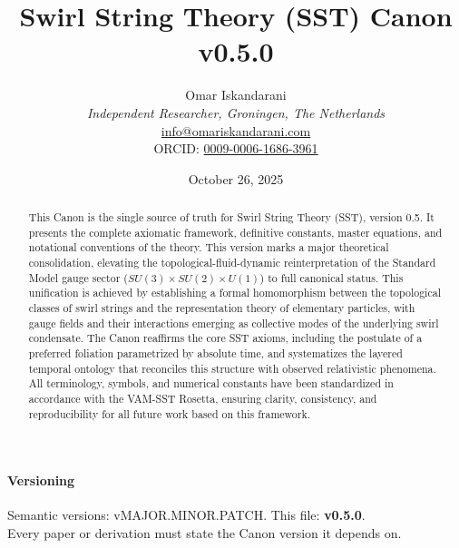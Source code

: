 \documentclass[11pt]{article}
\newcommand{\canonversion}{\textbf{v0.5.0}}
\newcommand{\papertitle}{Swirl String Theory (SST) Canon \canonversion}
\begin{document}
\title{\papertitle}
\author{Omar Iskandarani \\ \small{\textit{Independent Researcher, Groningen, The Netherlands}} \\ \small{\href{mailto:info@omariskandarani.com}{info@omariskandarani.com}} \\ \small{ORCID: \href{https://orcid.org/0009-0006-1686-3961}{0009-0006-1686-3961}}}
\date{October 26, 2025}
\maketitle

\begin{abstract}
This Canon is the single source of truth for Swirl String Theory (SST), version 0.5. It presents the complete axiomatic framework, definitive constants, master equations, and notational conventions of the theory. This version marks a major theoretical consolidation, elevating the topological-fluid-dynamic reinterpretation of the Standard Model gauge sector ($SU(3)\times SU(2)\times U(1)$) to full canonical status. This unification is achieved by establishing a formal homomorphism between the topological classes of swirl strings and the representation theory of elementary particles, with gauge fields and their interactions emerging as collective modes of the underlying swirl condensate. The Canon reaffirms the core SST axioms, including the postulate of a preferred foliation parametrized by absolute time, and systematizes the layered temporal ontology that reconciles this structure with observed relativistic phenomena. All terminology, symbols, and numerical constants have been standardized in accordance with the VAM-SST Rosetta, ensuring clarity, consistency, and reproducibility for all future work based on this framework.
\end{abstract}

\paragraph{Versioning} Semantic versions: vMAJOR.MINOR.PATCH. This file: \canonversion.\\
    Every paper or derivation must state the Canon version it depends on.

    \tableofcontents
    \newpage
\end{document}
